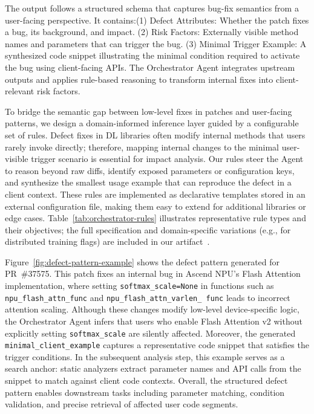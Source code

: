 The output follows a structured schema that captures bug-fix semantics from a user-facing perspective.
It contains:(1) Defect Attributes: Whether the patch fixes a bug, its background, and impact.
(2) Risk Factors: Externally visible method names and parameters that can trigger the bug.
(3) Minimal Trigger Example: A synthesized code snippet illustrating the minimal condition required to activate the bug using client-facing APIs.
The Orchestrator Agent integrates upstream outputs and applies rule-based reasoning to transform internal fixes into client-relevant risk factors.

To bridge the semantic gap between low-level fixes in patches and user-facing patterns, we design a domain-informed inference layer guided by a configurable set of rules.
Defect fixes in DL libraries often modify internal methods that users rarely invoke directly; therefore, mapping internal changes to the minimal user-visible trigger scenario is essential for impact analysis.
Our rules steer the Agent to reason beyond raw diffs, identify exposed parameters or configuration keys, and synthesize the smallest usage example that can reproduce the defect in a client context.
These rules are implemented as declarative templates stored in an external configuration file, making them easy to extend for additional libraries or edge cases.
Table~\ref{tab:orchestrator-rules} illustrates representative rule types and their objectives; the full specification and domain-specific variations (e.g., for distributed training flags) are included in our artifact~\cite{depradar}.


Figure~\ref{fig:defect-pattern-example} shows the defect pattern generated for PR~\#37575.
This patch fixes an internal bug in Ascend NPU’s Flash Attention implementation, where setting \texttt{softmax\_scale=None} in functions such as \texttt{npu\_flash\_attn\_func} and \texttt{npu\_flash\_attn\_varlen\_ func} leads to incorrect attention scaling.
Although these changes modify low-level device-specific logic, the Orchestrator Agent infers that users who enable Flash Attention v2 without explicitly setting \texttt{softmax\_scale} are silently affected.
Moreover, the generated \texttt{minimal\_client\_example} captures a representative code snippet that satisfies the trigger conditions.
In the subsequent analysis step, this example serves as a search anchor: static analyzers extract parameter names and API calls from the snippet to match against client code contexts.
Overall, the structured defect pattern enables downstream tasks including parameter matching, condition validation, and precise retrieval of affected user code segments.

